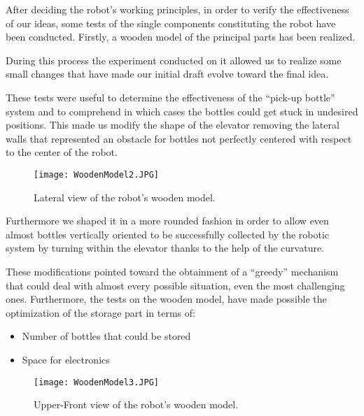 After deciding the robot’s working principles, in order to verify the effectiveness of our ideas, some tests of the single components constituting the robot have been conducted.
Firstly, a wooden model of the principal parts has been realized.


During this process the experiment conducted on it allowed us to realize some small changes that have made our initial draft evolve toward the final idea.

These tests were useful to determine the effectiveness of the “pick-up bottle” system and to comprehend in which cases the bottles could get stuck in undesired positions. This made us modify the shape of the elevator removing the lateral walls that represented an obstacle for bottles not perfectly centered with respect to the center of the robot.


\begin{wrapfigure}{r}{0.5\textwidth}
\begin{center}
\texttt{[image: WoodenModel2.JPG]}
\end{center}
\caption{Lateral view of the robot's wooden model.}
\label{fig:WoodenModel2}
\end{wrapfigure}

Furthermore we shaped it in a more rounded fashion in order to allow even almost bottles vertically oriented to be successfully collected by the robotic system by turning within the elevator thanks to the help of the curvature.

These modifications pointed toward the obtainment of a “greedy” mechanism that could deal with almost every possible situation, even the most challenging ones.
Furthermore, the tests on the wooden model, have made possible the optimization of the storage part in terms of:

\begin{itemize}
\item Number of bottles that could be stored
\item Space for electronics
\end{itemize}

\begin{wrapfigure}{l}{0.5\textwidth}
\begin{center}
 \texttt{[image: WoodenModel3.JPG]}
\end{center} 
 \caption{Upper-Front view of the robot's wooden model.}
\label{fig:WoodenModel3}
\end{wrapfigure}

